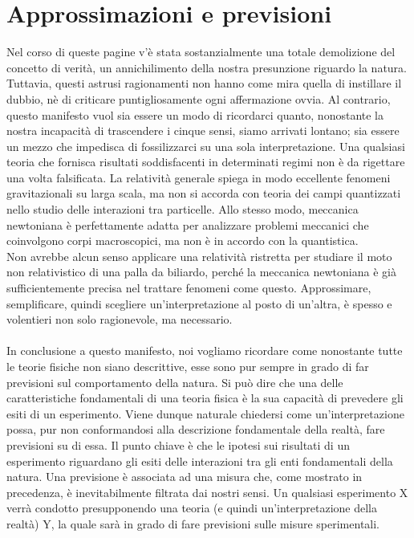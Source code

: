 \documentclass[]{article}
\begin{document}
	\section{Approssimazioni e previsioni}
	Nel corso di queste pagine v'è stata sostanzialmente una totale demolizione del concetto di verità, un annichilimento della nostra presunzione riguardo la natura. Tuttavia, questi astrusi ragionamenti non hanno come mira quella di instillare il dubbio, nè di criticare puntigliosamente ogni affermazione ovvia. Al contrario, questo manifesto vuol sia essere un modo di ricordarci quanto, nonostante la nostra incapacità di trascendere i cinque sensi, siamo arrivati lontano; sia essere un mezzo che impedisca di fossilizzarci su una sola interpretazione. Una qualsiasi teoria che fornisca risultati soddisfacenti in determinati regimi non è da rigettare una volta falsificata. La relatività generale spiega in modo eccellente fenomeni gravitazionali su larga scala, ma non si accorda con teoria dei campi quantizzati nello studio delle interazioni tra particelle. Allo stesso modo, meccanica newtoniana è perfettamente adatta per analizzare problemi meccanici che coinvolgono corpi macroscopici, ma non è in accordo con la quantistica.\\
	Non avrebbe alcun senso applicare una relatività ristretta per studiare il moto non relativistico di una palla da biliardo, perché la meccanica newtoniana è già sufficientemente precisa nel trattare fenomeni come questo. Approssimare, semplificare, quindi scegliere un'interpretazione al posto di un'altra, è spesso e volentieri non solo ragionevole, ma necessario.\\
	\\
	In conclusione a questo manifesto, noi vogliamo ricordare come nonostante tutte le teorie fisiche non siano descrittive, esse sono pur sempre in grado di far previsioni sul comportamento della natura.
	Si può dire che una delle caratteristiche fondamentali di una teoria fisica è la sua capacità di prevedere gli esiti di un esperimento. Viene dunque naturale chiedersi come un'interpretazione possa, pur non conformandosi alla descrizione fondamentale della realtà, fare previsioni su di essa. Il punto chiave è che le ipotesi sui risultati di un esperimento riguardano gli esiti delle interazioni tra gli enti fondamentali della natura. Una previsione è associata ad una misura che, come mostrato in precedenza, è inevitabilmente filtrata dai nostri sensi.
	Un qualsiasi esperimento X verrà condotto presupponendo una teoria (e quindi un'interpretazione della realtà) Y, la quale sarà in grado di fare previsioni sulle misure sperimentali.\\
\end{document}
